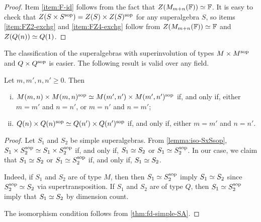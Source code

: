 \begin{proof}
	Item \eqref{item:F-id} follows from the fact that $Z(M_{m+n}(\mathbb{F})) \simeq \mathbb{F}$.
	It is easy to check that $Z(S\times S^{\mathrm{sop}}) = Z(S) \times Z(S)^{\mathrm{sop}}$ for any superalgebra $S$, so items \eqref{item:FZ2-exchg} and \eqref{item:FZ4-exchg} follow from $Z(M_{m+n}(\mathbb{F})) \simeq \mathbb{F}$ and $Z(Q(n)) \simeq Q(1)$.
\end{proof}

The classification of the superalgebras with superinvolution of types $M\times M^{\mathrm{sop}}$ and $Q\times Q^{\mathrm{sop}}$ is easier. 
The following result is valid over any field.

\begin{prop}
    Let $m,m',n,n' \geq 0$. %
    Then 
    \begin{enumerate}[(i)]
        \item $M(m,n) \times M(m,n)^{\mathrm{sop}} \simeq M(m',n') \times M(m',n')^{\mathrm{sop}}$ if, and only if, either $m = m'$ and $n = n'$, or $m = n'$ and $n = m'$; 
        \item $Q(n) \times Q(n)^{\mathrm{sop}} \simeq Q(n') \times Q(n')^{\mathrm{sop}}$ if, and only if, either $m = m'$ and $n = n'$.
    \end{enumerate}
\end{prop}

\begin{proof}
    Let $S_1$ and $S_2$ be simple superalgebras. 
    From \cref{lemma:iso-SxSsop}, $S_1\times S_2^{\mathrm{sop}} \simeq S_1\times S_2^{\mathrm{sop}}$ if, and only if, $S_1 \simeq S_2$ or $S_1 \simeq S_2^{\mathrm{sop}}$. 
    In our case, we claim that  $S_1 \simeq S_2$ or $S_1 \simeq S_2^{\mathrm{sop}}$ if, and only if, $S_1 \simeq S_2$. 
    
    Indeed, if $S_1$ and $S_2$ are of type $M$, then then $S_1 \simeq S_2^{\mathrm{sop}}$ imply $S_1 \simeq S_2$ since $S_2^{\mathrm{sop}} \simeq S_2$ via supertransposition. 
    If $S_1$ and $S_2$ are of type $Q$, then $S_1 \simeq S_2^{\mathrm{sop}}$ imply that $S_1 \simeq S_2$ by dimension count. 
    
    The isomorphism condition follows from \cref{thm:fd-simple-SA}.
\end{proof}

